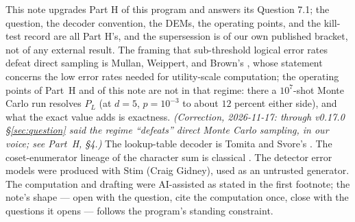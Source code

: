 \documentclass[11pt]{amsart}
\newcommand{\PL}{P_{L}}
\theoremstyle{plain}
\theoremstyle{definition}
\theoremstyle{remark}
\begin{document}
This note upgrades Part H of this program and answers its Question 7.1; the
question, the decoder convention, the DEMs, the operating points, and the
kill-test record are all Part H's, and the supersession is of our own
published bracket, not of any external result. The framing that
sub-threshold logical error rates defeat direct sampling is Mullan,
Weippert, and Brown's \cite{MWB}, whose statement concerns the low error
rates needed for utility-scale computation; the operating points of Part~H
and of this note are not in that regime: there a $10^7$-shot Monte Carlo run
resolves $\PL$ (at $d=5$, $p=10^{-3}$ to about $12$ percent either side), and
what the exact value adds is exactness. \emph{(Correction, 2026-11-17: through v0.17.0
\S\ref{sec:question} said the regime ``defeats'' direct Monte Carlo
sampling, in our voice; see Part~H, \S4.)} The lookup-table decoder is Tomita and
Svore's \cite{TS}. The coset-enumerator lineage of the character sum is
classical \cite{JP}. The detector error models were produced with Stim
(Craig Gidney), used as an untrusted generator. The computation and drafting
were AI-assisted as stated in the first footnote; the note's shape --- open
with the question, cite the computation once, close with the questions it
opens --- follows the program's standing constraint.
\end{document}
